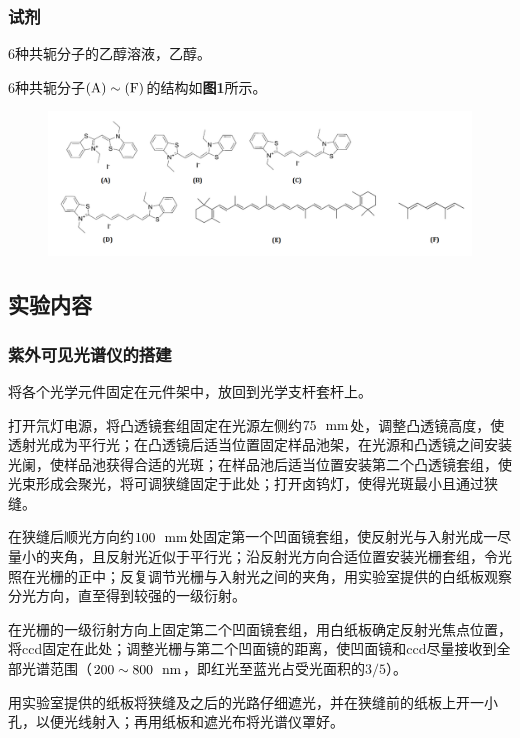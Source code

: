 \documentclass[12pt]{article}
\begin{document}
    	\subsubsection{试剂}
    	6种共轭分子的乙醇溶液，乙醇。\par
    	6种共轭分子$\rm{(A)}\sim\rm{(F)}$的结构如\textbf{图1}所示。
    	 \begin{figure}[h]
    		\centering
    		\includegraphics[width=1\textwidth]{1.png}
    	\end{figure}
    	\par
    	
    	
    	 \subsection{实验内容\citealp{physchemlab}}
			\subsubsection{紫外可见光谱仪的搭建}
		将各个光学元件固定在元件架中，放回到光学支杆套杆上。\par
		打开氘灯电源，将凸透镜套组固定在光源左侧约$75{\rm\ \ mm}$处，调整凸透镜高度，使透射光成为平行光；在凸透镜后适当位置固定样品池架，在光源和凸透镜之间安装光阑，使样品池获得合适的光斑；在样品池后适当位置安装第二个凸透镜套组，使光束形成会聚光，将可调狭缝固定于此处；打开卤钨灯，使得光斑最小且通过狭缝。\par
		在狭缝后顺光方向约$100{\rm\ \ mm}$处固定第一个凹面镜套组，使反射光与入射光成一尽量小的夹角，且反射光近似于平行光；沿反射光方向合适位置安装光栅套组，令光照在光栅的正中；反复调节光栅与入射光之间的夹角，用实验室提供的白纸板观察分光方向，直至得到较强的一级衍射。\par
		在光栅的一级衍射方向上固定第二个凹面镜套组，用白纸板确定反射光焦点位置，将ccd固定在此处；调整光栅与第二个凹面镜的距离，使凹面镜和ccd尽量接收到全部光谱范围（$200\sim800 \ \ {\rm nm}$，即红光至蓝光占受光面积的$3/5$）。\par
		用实验室提供的纸板将狭缝及之后的光路仔细遮光，并在狭缝前的纸板上开一小孔，以便光线射入；再用纸板和遮光布将光谱仪罩好。
\end{document}
